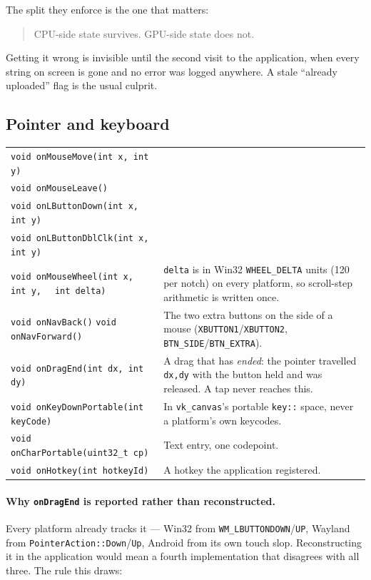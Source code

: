 \documentclass[11pt,a4paper]{article}
\begin{document}
The split they enforce is the one that matters:

\begin{quote}
CPU-side state survives. GPU-side state does not.
\end{quote}

Getting it wrong is invisible until the second visit to the application, when
every string on screen is gone and no error was logged anywhere. A stale
``already uploaded'' flag is the usual culprit.

\subsection{Pointer and keyboard}

\begin{longtable}{@{}p{}p{}@{}}
\toprule
\endhead
\texttt{void onMouseMove(int x, int y)} & \\
\texttt{void onMouseLeave()} & \\
\texttt{void onLButtonDown(int x, int y)} & \\
\texttt{void onLButtonDblClk(int x, int y)} & \\
\texttt{void onMouseWheel(int x, int y,} \newline \texttt{\ \ int delta)} &
\texttt{delta} is in Win32 \texttt{WHEEL\_DELTA} units (120 per notch) on every
platform, so scroll-step arithmetic is written once. \\
\addlinespace
\texttt{void onNavBack()} \newline \texttt{void onNavForward()} &
The two extra buttons on the side of a mouse
(\texttt{XBUTTON1}/\texttt{XBUTTON2}, \texttt{BTN\_SIDE}/\texttt{BTN\_EXTRA}). \\
\addlinespace
\texttt{void onDragEnd(int dx, int dy)} &
A drag that has \emph{ended}: the pointer travelled \texttt{dx,dy} with the
button held and was released. A tap never reaches this. \\
\addlinespace
\texttt{void onKeyDownPortable(int keyCode)} &
In \texttt{vk\_canvas}'s portable \texttt{key::} space, never a platform's own
keycodes. \\
\addlinespace
\texttt{void onCharPortable(uint32\_t cp)} &
Text entry, one codepoint. \\
\addlinespace
\texttt{void onHotkey(int hotkeyId)} &
A hotkey the application registered. \\
\bottomrule
\end{longtable}

\paragraph{Why \texttt{onDragEnd} is reported rather than reconstructed.} Every
platform already tracks it --- Win32 from \texttt{WM\_LBUTTONDOWN}/\texttt{UP},
Wayland from \texttt{PointerAction::Down}/\texttt{Up}, Android from its own
touch slop. Reconstructing it in the application would mean a fourth
implementation that disagrees with all three. The rule this draws:
\end{document}
